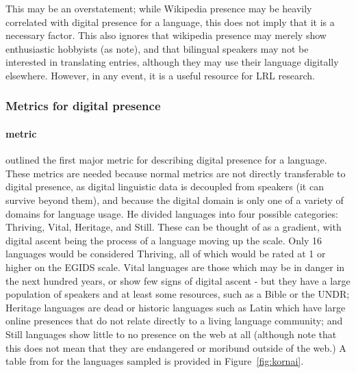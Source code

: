 This may be an overstatement; while Wikipedia presence may be heavily correlated with digital presence for a language, this does not imply that it is a necessary factor. This also ignores that wikipedia presence may merely show enthusiastic hobbyists (as \citep{soria2017digital} note), and that bilingual speakers may not be interested in translating entries, although they may use their language digitally elsewhere. However, in any event, it is a useful resource for LRL research.

\subsubsection{Metrics for digital presence}
\label{sec:metrics-for-digital-presence}

\paragraph{ metric}

\citet{kornai2013digital} outlined the first major metric for describing digital presence for a language. These metrics are needed because normal metrics are not directly transferable to digital presence, as digital linguistic data is decoupled from speakers (it can survive beyond them), and because the digital domain is only one of a variety of domains for language usage. He divided languages into four possible categories: Thriving, Vital, Heritage, and Still. These can be thought of as a gradient, with digital ascent being the process of a language moving up the scale. Only 16 languages would be considered Thriving, all of which would be rated at 1 or higher on the EGIDS scale. Vital languages are those which may be in danger in the next hundred years, or show few signs of digital ascent - but they have a large population of speakers and at least some resources, such as a Bible or the UNDR; Heritage languages are dead or historic languages such as Latin which have large online presences that do not relate directly to a living language community; and Still languages show little to no presence on the web at all (although note that this does not mean that they are endangered or moribund outside of the web.) A table from \citet{kornai2013digital} for the languages sampled is provided in Figure~\ref{fig:kornai}.

